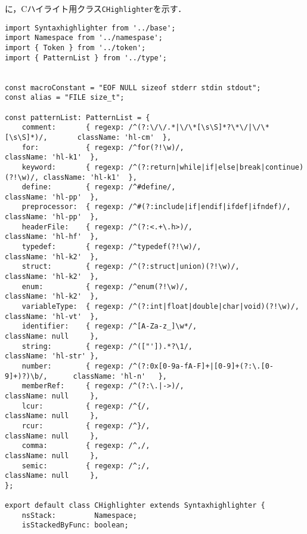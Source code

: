 \documentclass[autodetect-engine,dvi=dvipdfmx,ja=standard,
               a4j,11pt]{bxjsarticle}
\newcommand{\figref}[1]{\makebox{図~\ref{#1}}}
\begin{document}
\figref{prog:c}に，Cハイライト用クラス\verb|CHighlighter|を示す．

\begin{lstlisting}[caption={Cハイライタ({\tt c.ts})}, label={prog:c}]
import Syntaxhighlighter from '../base';
import Namespace from '../namespase';
import { Token } from '../token';
import { PatternList } from '../type';


const macroConstant = "EOF NULL sizeof stderr stdin stdout";
const alias = "FILE size_t";

const patternList: PatternList = {
    comment:       { regexp: /^(?:\/\/.*|\/\*[\s\S]*?\*\/|\/\*[\s\S]*)/,       className: 'hl-cm'  },
    for:           { regexp: /^for(?!\w)/,                                     className: 'hl-k1'  },
    keyword:       { regexp: /^(?:return|while|if|else|break|continue)(?!\w)/, className: 'hl-k1'  },
    define:        { regexp: /^#define/,                                       className: 'hl-pp'  },
    preprocessor:  { regexp: /^#(?:include|if|endif|ifdef|ifndef)/,            className: 'hl-pp'  },
    headerFile:    { regexp: /^(?:<.+\.h>)/,                                   className: 'hl-hf'  },
    typedef:       { regexp: /^typedef(?!\w)/,                                 className: 'hl-k2'  },
    struct:        { regexp: /^(?:struct|union)(?!\w)/,                        className: 'hl-k2'  },
    enum:          { regexp: /^enum(?!\w)/,                                    className: 'hl-k2'  },
    variableType:  { regexp: /^(?:int|float|double|char|void)(?!\w)/,          className: 'hl-vt'  },
    identifier:    { regexp: /^[A-Za-z_]\w*/,                                  className: null     },
    string:        { regexp: /^(["']).*?\1/,                                   className: 'hl-str' },
    number:        { regexp: /^(?:0x[0-9a-fA-F]+|[0-9]+(?:\.[0-9]+)?)\b/,      className: 'hl-n'   },
    memberRef:     { regexp: /^(?:\.|->)/,                                     className: null     },
    lcur:          { regexp: /^{/,                                             className: null     },
    rcur:          { regexp: /^}/,                                             className: null     },
    comma:         { regexp: /^,/,                                             className: null     },
    semic:         { regexp: /^;/,                                             className: null     },
};

export default class CHighlighter extends Syntaxhighlighter {
    nsStack:         Namespace;
    isStackedByFunc: boolean;


\end{lstlisting}
\end{document}
